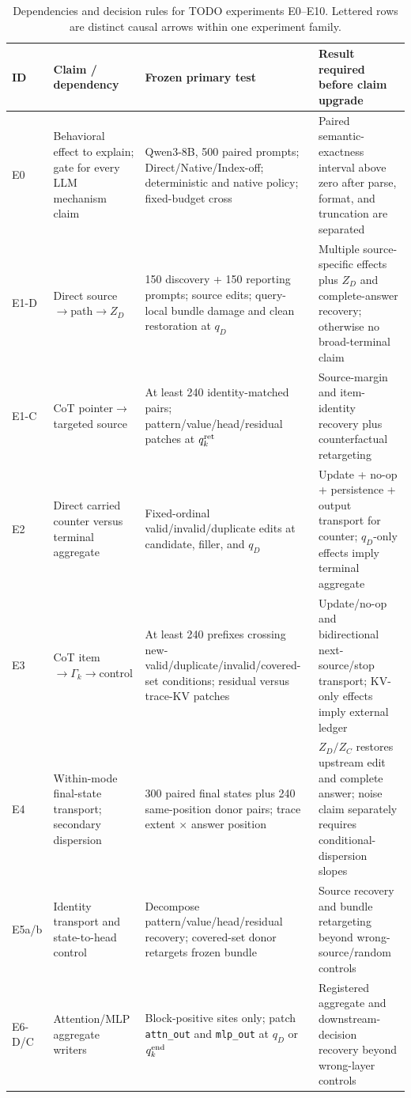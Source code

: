 \documentclass[11pt]{article}
\begin{document}
\begin{table}[H]
\centering
\scriptsize
\caption{Dependencies and decision rules for TODO experiments E0--E10. Lettered rows are distinct causal arrows within one experiment family.}
\begin{tabularx}{\textwidth}{@{}P{.06\textwidth}P{.19\textwidth}P{.35\textwidth}Y@{}}
\toprule
ID & Claim / dependency & Frozen primary test & Result required before claim upgrade \\
\midrule
E0 & Behavioral effect to explain; gate for every LLM mechanism claim & Qwen3-8B, 500 paired prompts; Direct/Native/Index-off; deterministic and native policy; fixed-budget cross & Paired semantic-exactness interval above zero after parse, format, and truncation are separated \\
E1-D & Direct source$\rightarrow$path$\rightarrow Z_D$ & 150 discovery + 150 reporting prompts; source edits; query-local bundle damage and clean restoration at $q_D$ & Multiple source-specific effects plus $Z_D$ and complete-answer recovery; otherwise no broad-terminal claim \\
E1-C & CoT pointer$\rightarrow$targeted source & At least 240 identity-matched pairs; pattern/value/head/residual patches at $q_k^{\rm ret}$ & Source-margin and item-identity recovery plus counterfactual retargeting \\
E2 & Direct carried counter versus terminal aggregate & Fixed-ordinal valid/invalid/duplicate edits at candidate, filler, and $q_D$ & Update + no-op + persistence + output transport for counter; $q_D$-only effects imply terminal aggregate \\
E3 & CoT item$\rightarrow\Gamma_k\rightarrow$control & At least 240 prefixes crossing new-valid/duplicate/invalid/covered-set conditions; residual versus trace-KV patches & Update/no-op and bidirectional next-source/stop transport; KV-only effects imply external ledger \\
E4 & Within-mode final-state transport; secondary dispersion & 300 paired final states plus 240 same-position donor pairs; trace extent $\times$ answer position & $Z_D/Z_C$ restores upstream edit and complete answer; noise claim separately requires conditional-dispersion slopes \\
E5a/b & Identity transport and state-to-head control & Decompose pattern/value/head/residual recovery; covered-set donor retargets frozen bundle & Source recovery and bundle retargeting beyond wrong-source/random controls \\
E6-D/C & Attention/MLP aggregate writers & Block-positive sites only; patch \texttt{attn\_out} and \texttt{mlp\_out} at $q_D$ or $q_k^{\rm end}$ & Registered aggregate and downstream-decision recovery beyond wrong-layer controls \\

\end{tabularx}
\end{table}
\end{document}
